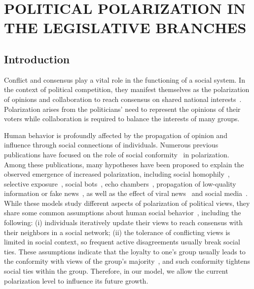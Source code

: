 \chapter{POLITICAL POLARIZATION IN THE LEGISLATIVE BRANCHES}
\label{chap:fad}

\let\thefootnote\relax{} 
\let\thefootnote\relax{}

\section{Introduction}
Conflict and consensus play a vital role in the functioning of a social system. In the context of political competition, they manifest themselves as the polarization of opinions and collaboration to reach consensus on shared national interests~\cite{diamond1990three}. Polarization arises from the politicians' need to represent the opinions of their voters while collaboration is required to balance the interests of many groups. 

Human behavior is profoundly affected by the propagation of opinion and influence through social connections of individuals. Numerous previous publications have focused on the role of social conformity~\cite{turner1991social,feldman2003enforcing,klucharev2009reinforcement} in polarization. Among these publications, many hypotheses have been proposed to explain the observed emergence of increased polarization, including social homophily~\cite{mcpherson2001birds}, selective 
exposure~\cite{stroud2010polarization}, social bots~\cite{ferrara2016rise}, echo chambers~\cite{garrett2009echo, madsen2018large}, propagation of low-quality 
information or fake news~\cite{jin2014misinformation, allcott2017social}, as well as the effect of viral news~\cite{lu2018scalable} and social media~\cite{garimella2018polarization}. 
While these models study different aspects of polarization of political views, they share some common assumptions about human social behavior~\cite{dixit2007political}, including the following: (i) individuals iteratively update their views to reach consensus with their neighbors in a social network; (ii) the tolerance of conflicting views is limited in social context, so frequent active disagreements usually break social ties. These assumptions indicate that the loyalty to one's group usually leads to the conformity with views of the group's majority~\cite{deutsch1955study}, and such conformity tightens social ties within the group. Therefore, in our model, we allow the current polarization level to influence its future growth.


